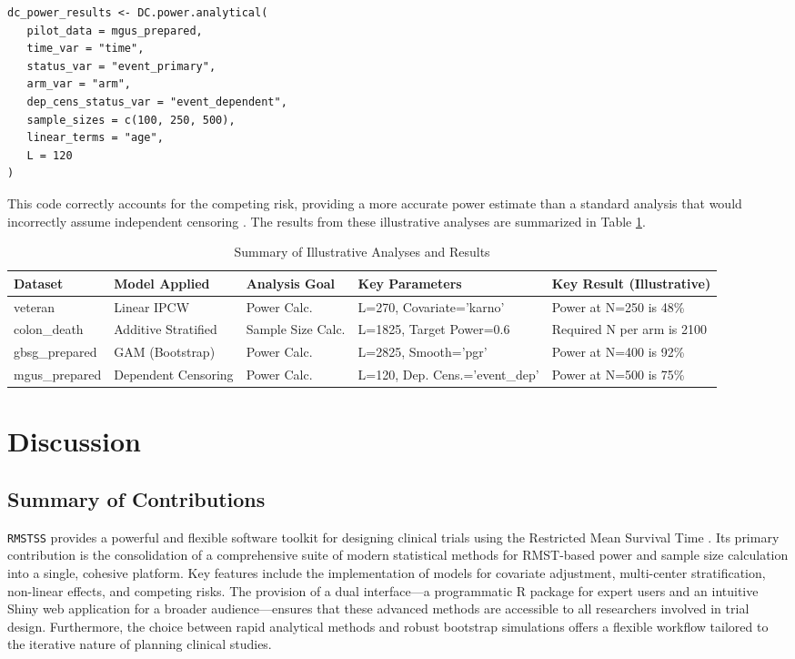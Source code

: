 \documentclass[article]{jss}
\begin{document}
\begin{lstlisting}
dc_power_results <- DC.power.analytical(
   pilot_data = mgus_prepared,
   time_var = "time",
   status_var = "event_primary",
   arm_var = "arm",
   dep_cens_status_var = "event_dependent",
   sample_sizes = c(100, 250, 500),
   linear_terms = "age",
   L = 120
)
\end{lstlisting}
This code correctly accounts for the competing risk, providing a more accurate power estimate than a standard analysis that would incorrectly assume independent censoring \cite{[1]}. The results from these illustrative analyses are summarized in Table \ref{tab:example_summary}.

\begin{table}[h!]
\centering
\caption{Summary of Illustrative Analyses and Results}
\label{tab:example_summary}
\begin{tabular}{@{}lllll@{}}
\toprule
\textbf{Dataset} & \textbf{Model Applied} & \textbf{Analysis Goal} & \textbf{Key Parameters} & \textbf{Key Result (Illustrative)} \\ \midrule
veteran & Linear IPCW & Power Calc. & L=270, Covariate='karno' & Power at N=250 is 48\% \\
colon\_death & Additive Stratified & Sample Size Calc. & L=1825, Target Power=0.6 & Required N per arm is 2100 \\
gbsg\_prepared & GAM (Bootstrap) & Power Calc. & L=2825, Smooth='pgr' & Power at N=400 is 92\% \\
mgus\_prepared & Dependent Censoring & Power Calc. & L=120, Dep. Cens.='event\_dep' & Power at N=500 is 75\% \\ \bottomrule
\end{tabular}
\end{table}

\section{Discussion}

\subsection{Summary of Contributions}
\texttt{RMSTSS} provides a powerful and flexible software toolkit for designing clinical trials using the Restricted Mean Survival Time \cite{[1]}. Its primary contribution is the consolidation of a comprehensive suite of modern statistical methods for RMST-based power and sample size calculation into a single, cohesive platform. Key features include the implementation of models for covariate adjustment, multi-center stratification, non-linear effects, and competing risks. The provision of a dual interface—a programmatic R package for expert users and an intuitive Shiny web application for a broader audience—ensures that these advanced methods are accessible to all researchers involved in trial design. Furthermore, the choice between rapid analytical methods and robust bootstrap simulations offers a flexible workflow tailored to the iterative nature of planning clinical studies.
\end{document}
